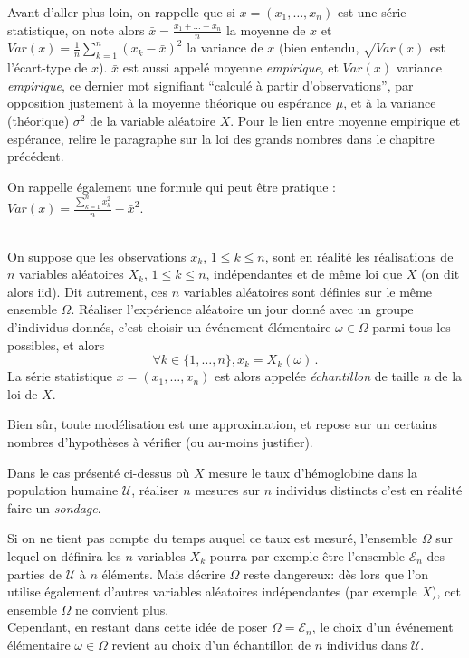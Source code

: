 \documentclass[12pt, a4paper]{book}
\numberwithin{equation}{section}
\begin{document}
Avant d'aller plus loin, on rappelle que si $x=(x_1,\hdots, x_n)$ est une série statistique, on note alors 
$\displaystyle \bar{x}=\frac{x_1+\hdots + x_n}{n}$ la moyenne de $x$ et 
$\displaystyle Var(x)=\frac{1}{n} \sum_{k=1}^n (x_k - \bar{x})^2$ la variance de $x$ (bien entendu, 
$\sqrt{Var(x)}$ est l'écart-type de $x$). $\bar{x}$ est aussi appelé moyenne \emph{empirique}, et $Var(x)$ variance \emph{empirique}, ce dernier mot signifiant ``calculé à partir d'observations'', par opposition justement à la moyenne théorique ou espérance $\mu$, et à la variance (théorique) $\sigma^2$ de la variable aléatoire $X$. %
Pour le lien entre moyenne empirique et espérance, relire le paragraphe sur la loi des grands nombres dans le chapitre précédent.

On rappelle également une formule qui peut être pratique :
$\displaystyle Var(x)=\frac{\sum_{k=1}^n x_k^2}{n} - \bar{x}^2$.

\\
On suppose que les observations $x_k$, $1\leq k\leq n$, sont en réalité les réalisations de $n$ variables aléatoires $X_k$, $1\leq k\leq n$, indépendantes et de même loi que $X$ (on dit alors iid). Dit autrement, ces $n$ variables aléatoires sont définies sur le même ensemble $\Omega$. Réaliser l'expérience aléatoire un jour donné avec un groupe d'individus donnés, c'est choisir un événement élémentaire $\omega\in\Omega$ parmi tous les possibles, et alors
\[ \forall k \in \{1, \ldots, n\}, x_k = X_k(\omega)\,. \]
La série statistique $x=(x_1,\hdots, x_n)$ est alors appelée \emph{échantillon} de taille $n$ de la loi de $X$.

Bien sûr, toute modélisation est une approximation, et repose sur un certains nombres d'hypothèses à vérifier (ou au-moins justifier).

Dans le cas présenté ci-dessus où $X$ mesure le taux d'hémoglobine dans la population humaine $\mathcal{U}$, réaliser $n$ mesures sur $n$ individus distincts c'est en réalité faire un \emph{sondage}.

Si on ne tient pas compte du temps auquel ce taux est mesuré, l'ensemble $\Omega$ sur lequel on définira les $n$ variables $X_k$ pourra par exemple être l'ensemble $\mathcal{E}_n$ des parties de $\mathcal{U}$ à $n$ éléments. Mais décrire $\Omega$ reste dangereux: dès lors que l'on utilise également d'autres variables aléatoires indépendantes (par exemple $X$), cet ensemble $\Omega$ ne convient plus.\\
Cependant, en restant dans cette idée de poser $\Omega=\mathcal{E}_n$, le choix d'un événement élémentaire $\omega\in\Omega$ revient au choix d'un échantillon de $n$ individus dans $\mathcal{U}$.
\end{document}

